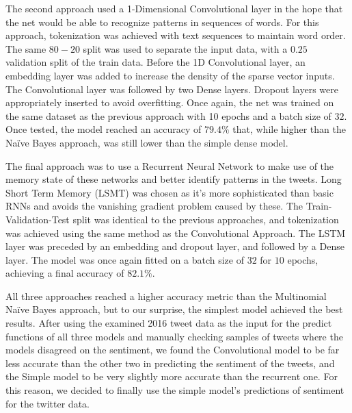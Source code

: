 \documentclass{article}
\begin{document}
  The second approach used a 1-Dimensional Convolutional layer in the
  hope that the net would be able to recognize patterns in sequences
  of words. For this approach, tokenization was achieved with text
  sequences to maintain word order. The same $80-20$ split was used to
  separate the input data, with a $0.25$ validation split of the train
  data. Before the 1D Convolutional layer, an embedding layer was
  added to increase the density of the sparse vector inputs. The
  Convolutional layer was followed by two Dense layers. Dropout layers
  were appropriately inserted to avoid overfitting. Once again, the
  net was trained on the same dataset as the previous approach with 10
  epochs and a batch size of $32$. Once tested, the model reached an
  accuracy of $79.4\%$ that, while higher than the Naïve Bayes
  approach, was still lower than the simple dense model. 


  The final approach was to use a Recurrent Neural Network to make use
  of the memory state of these networks and better identify patterns
  in the tweets. Long Short Term Memory (LSMT) was chosen as it’s more
  sophisticated than basic RNNs and avoids the vanishing gradient
  problem caused by these. The Train-Validation-Test split was
  identical to the previous approaches, and tokenization was achieved
  using the same method as the Convolutional Approach. The LSTM layer
  was preceded by an embedding and dropout layer, and followed by a
  Dense layer. The model was once again fitted on a batch size of $32$
  for $10$ epochs, achieving a final accuracy of $82.1\%$.  

  All three approaches reached a higher accuracy metric than the
  Multinomial Naïve Bayes approach, but to our surprise, the simplest
  model achieved the best results. After using the examined 2016 tweet
  data as the input for the predict functions of all three models and
  manually checking samples of tweets where the models disagreed on
  the sentiment, we found the Convolutional model to be far less
  accurate than the other two in predicting the sentiment of the
  tweets, and the Simple model to be very slightly more accurate than
  the recurrent one. For this reason, we decided to finally use the
  simple model’s predictions of sentiment for the twitter data. 
  
\end{document}
